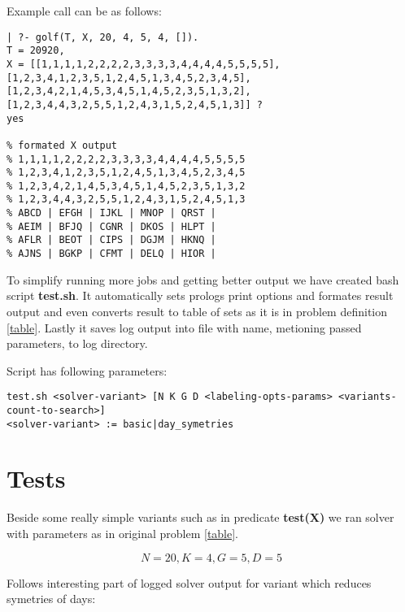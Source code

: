 \documentclass[a4paper]{article}
\theoremstyle{definition}
\theoremstyle{remark}
\newcommand{\ccc}[1]{{\mbox{\fontfamily{lmtt}\selectfont\textbf{#1}}}}
\begin{document}
Example call can be as follows:
\begin{verbatim}
| ?- golf(T, X, 20, 4, 5, 4, []).
T = 20920,
X = [[1,1,1,1,2,2,2,2,3,3,3,3,4,4,4,4,5,5,5,5],[1,2,3,4,1,2,3,5,1,2,4,5,1,3,4,5,2,3,4,5],[1,2,3,4,2,1,4,5,3,4,5,1,4,5,2,3,5,1,3,2],[1,2,3,4,4,3,2,5,5,1,2,4,3,1,5,2,4,5,1,3]] ? 
yes

% formated X output
% 1,1,1,1,2,2,2,2,3,3,3,3,4,4,4,4,5,5,5,5
% 1,2,3,4,1,2,3,5,1,2,4,5,1,3,4,5,2,3,4,5
% 1,2,3,4,2,1,4,5,3,4,5,1,4,5,2,3,5,1,3,2
% 1,2,3,4,4,3,2,5,5,1,2,4,3,1,5,2,4,5,1,3
% ABCD | EFGH | IJKL | MNOP | QRST | 
% AEIM | BFJQ | CGNR | DKOS | HLPT | 
% AFLR | BEOT | CIPS | DGJM | HKNQ | 
% AJNS | BGKP | CFMT | DELQ | HIOR | 
\end{verbatim}

To simplify running more jobs and getting better output we have created
bash script \ccc{test.sh}. It automatically sets prologs print options
and formates result output and even converts result to table of sets 
as it is in problem definition \ref{table}. Lastly it saves log output into
file with name, metioning passed parameters, to log directory.

Script has following parameters:
\begin{verbatim}                                            
test.sh <solver-variant> [N K G D <labeling-opts-params> <variants-count-to-search>]
<solver-variant> := basic|day_symetries
\end{verbatim}                                            

\section{Tests}
Beside some really simple variants such as in predicate \ccc{test(X)} we ran 
solver with parameters as in original problem \ref{table}.

$$N=20, K=4, G=5, D=5 $$

Follows interesting part of logged solver output for variant which reduces 
symetries of days:
\end{document}
